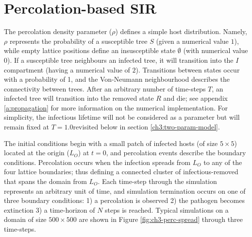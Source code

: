 \section{Percolation-based SIR}

The percolation density parameter ($\rho$) defines a simple host distribution.
Namely, $\rho$ represents the probability of a susceptible tree $S$ (given a numerical value $1$), 
while empty lattice positions define an insusceptible state $\emptyset$ (with numerical value $0$).
If a susceptible tree neighbours an infected tree, it will transition into the $I$ compartment (having a numerical value of $2$).
Transitions between states occur with a probability of 1, and the Von-Neumann neighbourhood describes the connectivity between trees.
After an arbitrary number of time-steps $T$, an infected tree will transition into the removed state $R$ and die; 
see appendix \ref{a:propagation} for more information on the numerical implementation. %
For simplicity, the infectious lifetime will not be considered as a parameter but will remain fixed at $T=1.0$\textemdash revisited below in section \ref{ch3:two-param-model}.

The initial conditions begin with a small patch of infected hosts (of size $5\times5$) located at the origin ($L_O$) at $t=0$, and percolation events describe the boundary conditions. 
Percolation occurs when the infection spreads from $L_O$ to any of the four lattice boundaries;  thus defining a connected cluster of infectious-removed that spans the domain from $L_O$.
Each time-step through the simulation represents an arbitrary unit of time, and simulation termination occurs on one of three boundary conditions: 
1) a percolation is observed 
2) the pathogen becomes extinction 
3) a time-horizon of $N$ steps is reached. 
Typical simulations on a domain of size $500 \times 500$ are shown in Figure \ref{fig:ch3-perc-spread} through three time-steps. 


